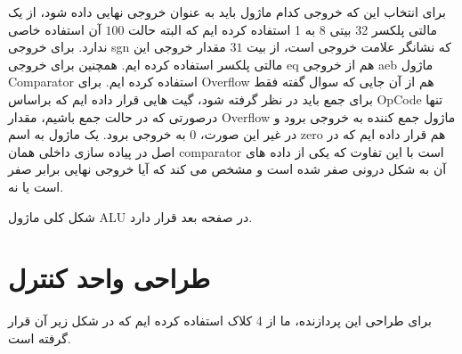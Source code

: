 \documentclass[12pt,titlepage,a4page , tikz , multi,table , svgnames,xcdraw]{article}
\begin{document}
برای انتخاب این که خروجی کدام ماژول باید به عنوان خروجی نهایی داده شود، از یک مالتی پلکسر 32 بیتی 8 به 1 استفاده کرده ایم که البته حالت $100$ آن استفاده خاصی ندارد. برای خروجی sgn که نشانگر علامت خروجی است، از بیت $31$ مقدار خروجی این مالتی پلکسر استفاده کرده ایم. همچنین برای خروجی eq هم از خروجی aeb ماژول Comparator استفاده کرده ایم. برای Overflow هم از آن جایی که سوال گفته فقط برای جمع باید در نظر گرفته شود، گیت هایی قرار داده ایم که براساس OpCode تنها درصورتی که در حالت جمع باشیم، مقدار Overflow ماژول جمع کننده به خروجی برود و در غیر این صورت، $0$ به خروجی برود. یک ماژول به اسم zero هم قرار داده ایم که در اصل در پیاده سازی داخلی همان comparator است با این تفاوت که یکی از داده های آن به شکل درونی صفر شده است و مشخص می کند که آیا خروجی نهایی برابر صفر است یا نه.

شکل کلی ماژول ALU در صفحه بعد قرار دارد.



\begin{landscape}

\thispagestyle{empty}




\end{landscape}




\section{طراحی واحد کنترل}

برای طراحی این پردازنده، ما از 4 کلاک استفاده کرده ایم که در شکل زیر  آن قرار گرفته است.
\end{document}
